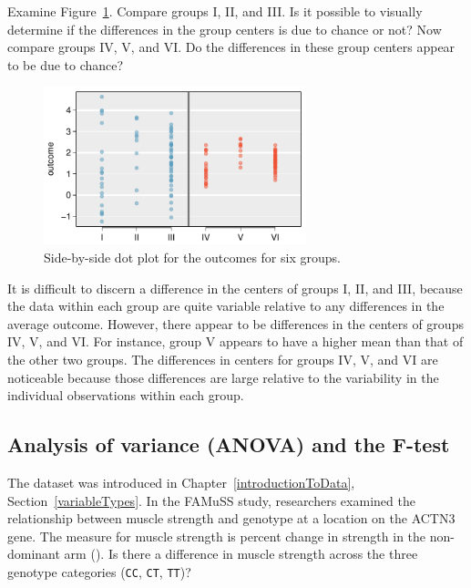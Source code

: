 \begin{example}{Examine Figure~\ref{toyANOVA}. Compare groups I, II, and III. Is it possible to visually determine if the differences in the group centers is due to chance or not? Now compare groups IV, V, and VI. Do the differences in these group centers appear to be due to chance?
		
\begin{figure}[h]
	\centering
	\includegraphics[width=0.68\textwidth]{ch_inference_for_means_oi_biostat/figures/toyANOVA/toyANOVA}
	\caption{Side-by-side dot plot for the outcomes for six groups.}
	\label{toyANOVA}
\end{figure}		

}
	
	It is difficult to discern a difference in the centers of groups I, II, and III, because the data within each group are quite variable relative to any differences in the average outcome. However, there appear to be differences in the centers of groups IV, V, and VI. For instance, group V appears to have a higher mean than that of the other two groups. The differences in centers for groups IV, V, and VI are noticeable because those differences are large relative to the variability in the individual observations within each group.
\end{example}

\subsection{Analysis of variance (ANOVA) and the F-test}
\label{ANOVASection}

The  dataset was introduced in Chapter~\ref{introductionToData}, Section~\ref{variableTypes}. In the FAMuSS study, researchers examined the relationship between muscle strength and genotype at a location on the ACTN3 gene. The measure for muscle strength is percent change in strength in the non-dominant arm (). Is there a difference in muscle strength across the three genotype categories (\texttt{CC}, \texttt{CT}, \texttt{TT})?

